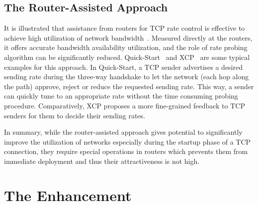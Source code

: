 \documentclass[12pt,onecolumn]{IEEEtran}
\begin{document}
\subsection{The Router-Assisted Approach}


\begin{comment}
\footnote{Regarding network routers, only those with droptail mechanism, that
simply drop the extra packets when the buffer becomes full, are evaluated
because they are most widely deployed. We don't consider other AQM schemes
\cite{saad2007,Ariba2009}, since it is not like one of them will dominant the
Internet over the night.} \end{comment}


It is illustrated that assistance from routers for TCP rate control is
effective to achieve high utilization of network bandwidth~\cite{Ariba2009}.
Measured directly at the routers, it offers accurate bandwidth availability
utilization, and the role of rate probing algorithm can be significantly
reduced. Quick-Start~\cite{quickstart1} and XCP~\cite{XCP} are some typical
examples for this approach. In Quick-Start, a TCP sender advertises a desired
sending rate during the three-way handshake to let the network (each hop along
the path) approve, reject or reduce the requested sending rate. This way, a
sender can quickly tune to an appropriate rate without the time consuming
probing procedure. Comparatively, XCP proposes a more fine-grained feedback to
TCP senders for them to decide their sending rates.

In summary, while the router-assisted approach gives potential to significantly
improve the utilization of networks especially during the startup phase of a
TCP connection, they require special operations in routers which prevents them
from immediate deployment and thus their attractiveness is not high.


\section{The Enhancement}
\end{document}

